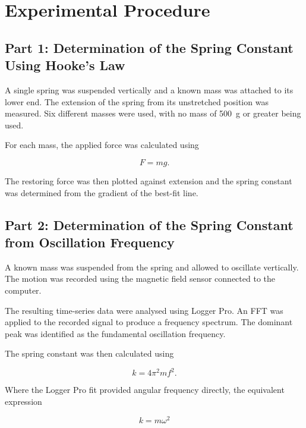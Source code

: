 \documentclass[12pt,a4paper]{article}
\begin{document}
\newpage

\section{Experimental Procedure}

\subsection{Part 1: Determination of the Spring Constant Using Hooke's Law}

A single spring was suspended vertically and a known mass was attached to its lower end. The extension of the spring from its unstretched position was measured. Six different masses were used, with no mass of \SI{500}{g} or greater being used.

For each mass, the applied force was calculated using

\begin{equation}
F=mg.
\end{equation}

The restoring force was then plotted against extension and the spring constant was determined from the gradient of the best-fit line.

\subsection{Part 2: Determination of the Spring Constant from Oscillation Frequency}

A known mass was suspended from the spring and allowed to oscillate vertically. The motion was recorded using the magnetic field sensor connected to the computer.

The resulting time-series data were analysed using Logger Pro. An FFT was applied to the recorded signal to produce a frequency spectrum. The dominant peak was identified as the fundamental oscillation frequency.

The spring constant was then calculated using

\begin{equation}
k=4\pi^2mf^2.
\end{equation}

Where the Logger Pro fit provided angular frequency directly, the equivalent expression

\begin{equation}
k=m\omega^2
\end{equation}
\end{document}
